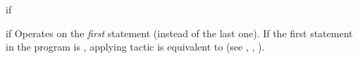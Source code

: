 \begin{tactic}{if}
  \begin{tsyntax}{if}
  Operates on the \emph{first} statement (instead of the last one). If
  the first statement in the program is
  ,
  applying tactic  is equivalent to
  (see , , ).
  \end{tsyntax}
\end{tactic}
